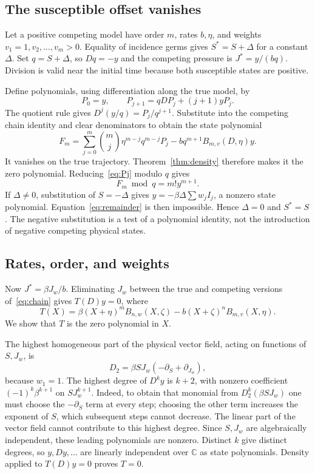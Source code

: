 \documentclass[11pt]{article}
\theoremstyle{remark}\newtheorem{remark}[theorem]{Remark}
\newcommand{\C}{\mathbb C}
\begin{document}
\subsection{The susceptible offset vanishes}
Let a positive competing model have order $m$, rates $b,\eta$, and weights $v_1=1,v_2,\ldots,v_m>0$. Equality of incidence germs gives $S^*=S+\Delta$ for a constant $\Delta$. Set $q=S+\Delta$, so $Dq=-y$ and the competing pressure is $J^*=y/(bq)$. Division is valid near the initial time because both susceptible states are positive.

Define polynomials, using differentiation along the true model, by
\begin{equation}\label{eq:Pj}
 P_0=y,\qquad P_{j+1}=qDP_j+(j+1)yP_j.
\end{equation}
The quotient rule gives $D^j(y/q)=P_j/q^{j+1}$. Substitute into the competing chain identity and clear denominators to obtain the state polynomial
\begin{equation}\label{eq:Fm}
 F_m=\sum_{j=0}^m\binom mj\eta^{m-j}q^{m-j}P_j
       -bq^{m+1}B_{m,v}(D,\eta)y.
\end{equation}
It vanishes on the true trajectory. Theorem~\ref{thm:density} therefore makes it the zero polynomial. Reducing~\eqref{eq:Pj} modulo $q$ gives
\begin{equation}\label{eq:remainder}
 F_m\bmod q=m!y^{m+1}.
\end{equation}
If $\Delta\ne0$, substitution of $S=-\Delta$ gives $y=-\beta\Delta\sum w_j I_j$, a nonzero state polynomial. Equation~\eqref{eq:remainder} is then impossible. Hence $\Delta=0$ and $S^*=S$. The negative substitution is a test of a polynomial identity, not the introduction of negative competing physical states.

\subsection{Rates, order, and weights}
Now $J^*=\beta J_w/b$. Eliminating $J_w$ between the true and competing versions of~\eqref{eq:chain} gives $T(D)y=0$, where
\begin{equation}\label{eq:T}
 T(X)=\beta(X+\eta)^m B_{n,w}(X,\zeta)
       -b(X+\zeta)^n B_{m,v}(X,\eta).
\end{equation}
We show that $T$ is the zero polynomial in $X$.

The highest homogeneous part of the physical vector field, acting on functions of $S,J_w$, is
\[
 D_2=\beta S J_w(-\partial_S+\partial_{J_w}),
\]
because $w_1=1$. The highest degree of $D^k y$ is $k+2$, with nonzero coefficient $(-1)^k\beta^{k+1}$ on $S J_w^{k+1}$. Indeed, to obtain that monomial from $D_2^k(\beta S J_w)$ one must choose the $-\partial_S$ term at every step; choosing the other term increases the exponent of $S$, which subsequent steps cannot decrease. The linear part of the vector field cannot contribute to this highest degree. Since $S,J_w$ are algebraically independent, these leading polynomials are nonzero. Distinct $k$ give distinct degrees, so $y,Dy,\ldots$ are linearly independent over $\C$ as state polynomials. Density applied to $T(D)y=0$ proves $T=0$.
\end{document}
